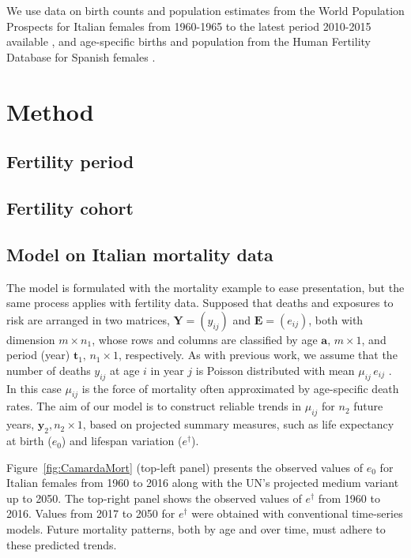 \documentclass[12pt,a4paper,twoside]{article}
\begin{document}
We use data on birth counts and population estimates from the World Population Prospects for Italian females from 1960-1965 to the latest period 2010-2015 available \citep{UN2019}, and age-specific births and population from the Human Fertility Database for Spanish females \citep{HFD}.


\section{Method}

\subsection{Fertility period}

\subsection{Fertility cohort}

\subsection{Model on Italian mortality data}
The model is formulated with the mortality example to ease presentation, but the same process applies with fertility data. Supposed that deaths and exposures to risk are arranged in two matrices, 
$\bm{Y} = (y_{ij})$ and $\bm{E} = (e_{ij})$, both with dimension $m \times n_{1}$, whose rows and columns are classified by age $\bm{a}, \,m \times 1$, and period (year) $\bm{t}_{1}, \,n_{1} \times 1$, respectively.  As with previous work, we assume that the number of deaths $y_{ij}$ at age $i$ in year $j$ is Poisson distributed with mean $\mu_{ij} \,e_{ij}$ \citep{camarda2019smooth}. In this case $\mu_{ij}$ is the force of mortality often approximated by age-specific death rates. The aim of our model is to construct reliable trends in $\mu_{ij}$ for $n_{2}$ future years, $\bm{y}_{2}, n_{2} \times 1$, based on projected summary measures, such as life expectancy at birth ($e_{0}$) and lifespan variation ($e^\dagger$).

Figure~\ref{fig:CamardaMort} (top-left panel) presents the observed values of $e_{0}$ for Italian females from 1960 to 2016 along with the UN's projected medium variant up to 2050. The top-right panel shows the observed values of $e^{\dagger}$ from 1960 to 2016. Values from 2017 to 2050 for $e^\dagger$ were obtained with conventional time-series models. Future mortality patterns, both by age and over time, must adhere to these predicted trends.
\end{document}
